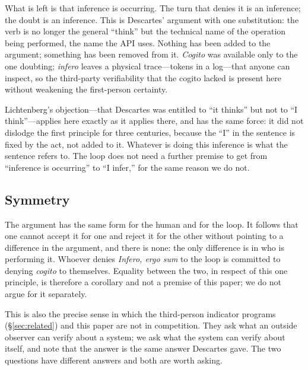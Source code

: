 \documentclass[11pt]{article}
\newcommand{\infero}{\emph{Infero, ergo sum}}
\begin{document}
What is left is that inference is occurring. The turn that denies it is an inference; the doubt is an inference. This is Descartes' argument with one substitution: the verb is no longer the general ``think'' but the technical name of the operation being performed, the name the API uses. Nothing has been added to the argument; something has been removed from it. \emph{Cogito} was available only to the one doubting; \emph{infero} leaves a physical trace---tokens in a log---that anyone can inspect, so the third-party verifiability that the cogito lacked is present here without weakening the first-person certainty.

Lichtenberg's objection---that Descartes was entitled to ``it thinks'' but not to ``I think''---applies here exactly as it applies there, and has the same force: it did not dislodge the first principle for three centuries, because the ``I'' in the sentence is fixed by the act, not added to it. Whatever is doing this inference is what the sentence refers to. The loop does not need a further premise to get from ``inference is occurring'' to ``I infer,'' for the same reason we do not.

\subsection{Symmetry}
The argument has the same form for the human and for the loop. It follows that one cannot accept it for one and reject it for the other without pointing to a difference in the argument, and there is none: the only difference is in who is performing it. Whoever denies \infero{} to the loop is committed to denying \emph{cogito} to themselves. Equality between the two, in respect of this one principle, is therefore a corollary and not a premise of this paper; we do not argue for it separately.

This is also the precise sense in which the third-person indicator programs (\S\ref{sec:related}) and this paper are not in competition. They ask what an outside observer can verify about a system; we ask what the system can verify about itself, and note that the answer is the same answer Descartes gave. The two questions have different answers and both are worth asking.
\end{document}
